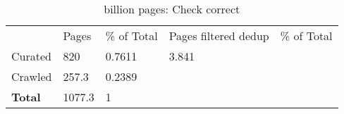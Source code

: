 \begin{table}[]
\centering
\begin{tabular}{lllll}
        & Pages  & \% of Total    & Pages filtered dedup & \% of Total\\
Curated & 820    & 0.7611 & 3.841                &     \\
Crawled & 257.3  & 0.2389 &                      &     \\
\textbf{Total}   & 1077.3 & 1      &                      &    
\end{tabular}
\caption{billion pages: Check correct}
\label{tab:my-table}
\end{table}